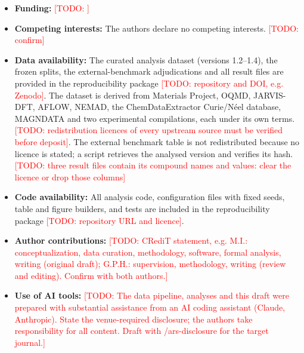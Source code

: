 \documentclass[pdflatex,sn-nature]{sn-jnl}
\newcommand{\todo}[1]{\textcolor{red}{[TODO: #1]}}
\begin{document}
\begin{itemize}
\item \textbf{Funding:} \todo{}
\item \textbf{Competing interests:} The authors declare no competing interests. \todo{confirm}
\item \textbf{Data availability:} The curated analysis dataset (versions 1.2--1.4), the frozen splits, the external-benchmark adjudications and all result files are provided in the reproducibility package \todo{repository and DOI, e.g. Zenodo}. The dataset is derived from Materials Project, OQMD, JARVIS-DFT, AFLOW, NEMAD, the ChemDataExtractor Curie/N\'eel database, MAGNDATA and two experimental compilations, each under its own terms. \todo{redistribution licences of every upstream source must be verified before deposit}. The external benchmark table is not redistributed because no licence is stated; a script retrieves the analysed version and verifies its hash. \todo{three result files contain its compound names and values: clear the licence or drop those columns}
\item \textbf{Code availability:} All analysis code, configuration files with fixed seeds, table and figure builders, and tests are included in the reproducibility package \todo{repository URL and licence}.
\item \textbf{Author contributions:} \todo{CRediT statement, e.g. M.I.: conceptualization, data curation, methodology, software, formal analysis, writing (original draft); G.P.H.: supervision, methodology, writing (review and editing). Confirm with both authors.}
\item \textbf{Use of AI tools:} \todo{The data pipeline, analyses and this draft were prepared with substantial assistance from an AI coding assistant (Claude, Anthropic). State the venue-required disclosure; the authors take responsibility for all content. Draft with /ars-disclosure for the target journal.}
\end{itemize}


\end{document}
